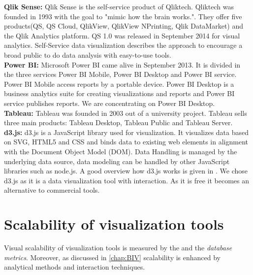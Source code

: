 \textbf{Qlik Sense: }
Qlik Sense is the self-service product of Qliktech. Qliktech was founded in 1993 with the goal to "mimic how the brain works."\cite{qlikHistory}. They offer five products(QS, QS Cloud, QlikView, QlikView NPrinting, Qlik DataMarket) and the Qlik Analytics platform. QS 1.0 was released in September 2014 for visual analytics. 
Self-Service data visualization describes the approach to encourage a broad public to do data analysis with easy-to-use tools.\\
\textbf{Power BI: }
Microsoft Power BI came alive in September 2013. It is divided in the three services Power BI Mobile, Power BI Desktop and Power BI service. Power BI Mobile access reports by a portable device. Power BI Desktop is a business analytics suite for creating visualizations and reports and Power BI service publishes reports. We are concentrating on Power BI Desktop.\\
\textbf{Tableau: }
Tableau was founded in 2003 out of a university project. Tableau sells three main products: Tableau Desktop, Tableau Public and Tableau Server.\\ 
\textbf{d3.js: }
d3.js is a JavaScript library used for visualization. It visualizes data based on SVG, HTML5 and CSS and binds data to existing web elements in alignment with the Document Object Model (DOM).  Data Handling is managed by the underlying data source, data modeling can be handled by other JavaScript libraries such as node.js. A good overview how d3.js works is given in \cite{Meeks}. 
We chose d3.js as it is a data visualization tool with interaction. As it is free it becomes an alternative to commercial tools.\\


\section{Scalability of visualization tools}\label{tool:scalability}
Visual scalability of visualization tools is measured by the  and the \textit{database metrics}. Moreover, as discussed in \ref{chap:BIV} scalability is enhanced by analytical methods and interaction techniques.


